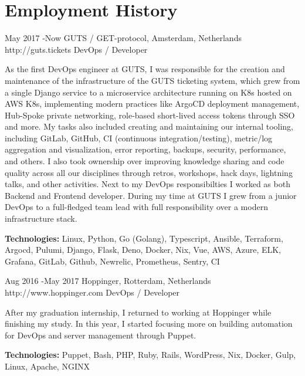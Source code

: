 \documentclass[10pt]{article} %
\begin{document}



\section{Employment History}

\job
{May 2017 -}{Now}
{GUTS / GET-protocol, Amsterdam, Netherlands}
{http://guts.tickets}
{DevOps / Developer}
{As the first DevOps engineer at GUTS, I was responsible for the creation and maintenance of the infrastructure of the GUTS ticketing system, which grew from a single Django service to a microservice architecture running on K8s hosted on AWS K8s, implementing modern practices like ArgoCD deployment management, Hub-Spoke private networking, role-based short-lived access tokens through SSO and more. My tasks also included creating and maintaining our internal tooling, including GitLab, GitHub, CI (continuous integration/testing), metric/log aggregation and visualization, error reporting, backups, security, performance, and others. I also took ownership over improving knowledge sharing and code quality across all our disciplines through retros, workshops, hack days, lightning talks, and other activities. Next to my DevOps responsibilties I worked as both Backend and Frontend developer. During my time at GUTS I grew from a junior DevOps to a full-fledged team lead with full responsibility over a modern infrastructure stack.

\rule{0mm}{5mm}\textbf{Technologies:} Linux, Python, Go (Golang), Typescript, Ansible, Terraform, Argocd, Pulumi, Django, Flask, Deno, Docker, Nix, Vue, AWS, Azure, ELK, Grafana, GitLab, Github, Newrelic, Prometheus, Sentry, CI}

\job
{Aug 2016 -}{May 2017}
{Hoppinger, Rotterdam, Netherlands}
{http://www.hoppinger.com}
{DevOps / Developer}
{After my graduation internship, I returned to working at Hoppinger while finishing my study. In this year, I started focusing more on building automation for DevOps and server management through Puppet.

\rule{0mm}{5mm}\textbf{Technologies:} Puppet, Bash, PHP, Ruby, Rails, WordPress, Nix, Docker, Gulp, Linux, Apache, NGINX }
\end{document}
